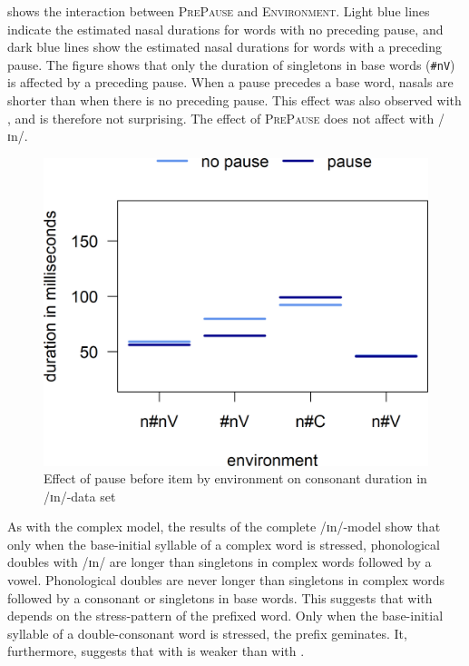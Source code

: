 
 shows the interaction between \textsc{PrePause} and \textsc{Environment}. Light blue lines indicate the estimated nasal durations for words with no preceding pause, and dark blue lines show the estimated nasal durations for words with a preceding pause.
The figure shows that only the duration of singletons in base words (\texttt{\#nV}) is affected by a preceding pause. When a pause precedes a base word, nasals are shorter than when there is no preceding pause. This effect was also observed with , and is therefore not surprising. 
The effect of \textsc{PrePause} does not affect  with /ɪn/.



\begin{figure}
	
	
	
	\includegraphics [scale=0.5] {images/Experiment/InModelCompleteInterEnvPause}
	\caption{Effect of pause before item by environment on consonant duration in /ɪn/-data set}
	\label{fig:Env Pause In complete experiment}
\end{figure}	




As with the complex model, the results of the complete /ɪn/-model show that only when the base-initial syllable of a complex word is stressed, phonological doubles with /ɪn/ are longer than singletons in complex words followed by a vowel. 
Phonological doubles are never longer than singletons in complex words followed by a consonant or singletons in base words. 
This suggests that  with  depends on the stress-pattern of the prefixed word.  Only when the base-initial syllable of a double-consonant word is stressed, the prefix geminates. It, furthermore, suggests that  with  is weaker than  with .


